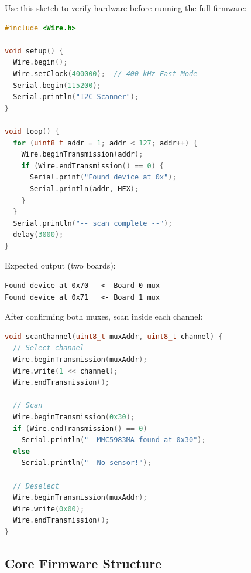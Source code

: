 \documentclass[12pt]{article}
\begin{document}
Use this sketch to verify hardware before running the full firmware:

\begin{lstlisting}[language=C++, caption={I$^2$C scanner sketch}]
#include <Wire.h>

void setup() {
  Wire.begin();
  Wire.setClock(400000);  // 400 kHz Fast Mode
  Serial.begin(115200);
  Serial.println("I2C Scanner");
}

void loop() {
  for (uint8_t addr = 1; addr < 127; addr++) {
    Wire.beginTransmission(addr);
    if (Wire.endTransmission() == 0) {
      Serial.print("Found device at 0x");
      Serial.println(addr, HEX);
    }
  }
  Serial.println("-- scan complete --");
  delay(3000);
}
\end{lstlisting}

Expected output (two boards):
\begin{lstlisting}
Found device at 0x70   <- Board 0 mux
Found device at 0x71   <- Board 1 mux
\end{lstlisting}

After confirming both muxes, scan inside each channel:

\begin{lstlisting}[language=C++, caption={Per-channel I$^2$C scan}]
void scanChannel(uint8_t muxAddr, uint8_t channel) {
  // Select channel
  Wire.beginTransmission(muxAddr);
  Wire.write(1 << channel);
  Wire.endTransmission();

  // Scan
  Wire.beginTransmission(0x30);
  if (Wire.endTransmission() == 0)
    Serial.println("  MMC5983MA found at 0x30");
  else
    Serial.println("  No sensor!");

  // Deselect
  Wire.beginTransmission(muxAddr);
  Wire.write(0x00);
  Wire.endTransmission();
}
\end{lstlisting}

\subsection{Core Firmware Structure}
\end{document}
